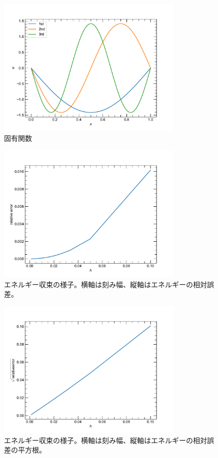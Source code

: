 \documentclass[xelatex,ja=standard]{bxjsarticle}
\begin{document}
\begin{figure}
    \centering
    \includegraphics[width=0.8\textwidth]{./figs/eigenfunction.pdf}
    \caption{固有関数}
    \label{fig:eigenfunction}
\end{figure}
\begin{figure}
    \centering
    \includegraphics[width=0.8\textwidth]{./figs/convergence.pdf}
    \caption{エネルギー収束の様子。横軸は刻み幅、縦軸はエネルギーの相対誤差。}
    \label{fig:convergence}
\end{figure}
\begin{figure}
    \centering
    \includegraphics[width=0.8\textwidth]{./figs/convergence_sqrt.pdf}
    \caption{エネルギー収束の様子。横軸は刻み幅、縦軸はエネルギーの相対誤差の平方根。}
    \label{fig:convergence_sqrt}
\end{figure}
\end{document}
